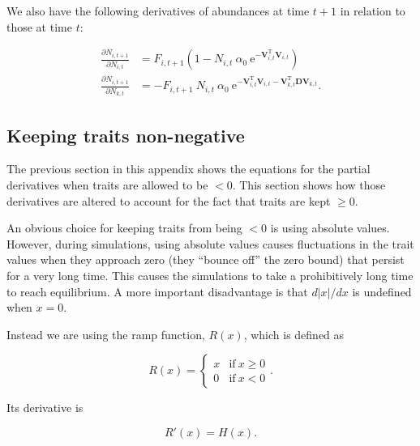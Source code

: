 We also have the following derivatives of abundances at time $t+1$ in relation
to those at time $t$:

\begin{equation*}
\begin{split}
    \frac{ \partial N_{i,t+1} }{ \partial N_{i,t} } &= 
        F_{i,t+1}
        \left(
            1 - N_{i,t} \: \alpha_0 \: 
            \text{e}^{ -\mathbf{V}_{i,t}^{\text{T}} \mathbf{V}_{i,t} } 
        \right) \\
    \frac{ \partial N_{i,t+1} }{ \partial N_{k,t} } &= 
        - F_{i,t+1} \: N_{i,t} \: \alpha_0 \: 
        \text{e}^{ -\mathbf{V}_{i,t}^{\text{T}} \mathbf{V}_{i,t} -
            \mathbf{V}_{k,t}^{\text{T}} \mathbf{D} \mathbf{V}_{k,t} } 
    \textrm{.}
\end{split}
\end{equation*}





\subsection*{Keeping traits non-negative}


The previous section in this appendix shows the equations for the
partial derivatives when traits are allowed to be $<0$.
This section shows how those derivatives are altered to account for
the fact that traits are kept $\ge 0$.


An obvious choice for keeping traits from being $<0$ is using absolute
values.
However, during simulations, using absolute values causes fluctuations
in the trait values when they approach zero (they ``bounce off''
the zero bound) that persist for a very long time.
This causes the simulations to take a prohibitively long time to reach
equilibrium.
A more important disadvantage is that $d \lvert x \rvert / dx$ is
undefined when $x = 0$.


Instead we are using the ramp function, $R(x)$, which is defined as

\begin{equation*}
    R(x) = \begin{cases}
        x & \text{if}\ x \ge 0 \\
        0 & \text{if}\ x < 0
        \end{cases}
    \text{.}
\end{equation*}


\noindent Its derivative is

\begin{equation*}
    R'(x) = H(x).
\end{equation*}


